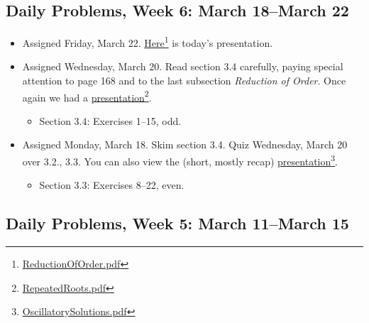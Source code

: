 \subsection{Daily Problems, Week 6: March 18--March 22}
\label{dailyproblemsweek6:march18--march22}

\begin{itemize}
\item Assigned Friday, March 22. \href{ReductionOfOrder.pdf}{Here}\footnote{\href{ReductionOfOrder.pdf}{ReductionOfOrder.pdf}} is today's presentation.

\item Assigned Wednesday, March 20. Read section 3.4 carefully, paying special attention to page 168 and to the last subsection \emph{Reduction of Order}. Once again we had a \href{RepeatedRoots.pdf}{presentation}\footnote{\href{RepeatedRoots.pdf}{RepeatedRoots.pdf}}.

\begin{itemize}
\item Section 3.4: Exercises 1--15, odd.

\end{itemize}

\item Assigned Monday, March 18. Skim section 3.4. Quiz Wednesday, March 20 over 3.2., 3.3. You can also view the (short, mostly recap) \href{OscillatorySolutions.pdf}{presentation}\footnote{\href{OscillatorySolutions.pdf}{OscillatorySolutions.pdf}}.

\begin{itemize}
\item Section 3.3: Exercises 8--22, even.

\end{itemize}

\end{itemize}

\subsection{Daily Problems, Week 5: March 11--March 15}
\label{dailyproblemsweek5:march11--march15}

